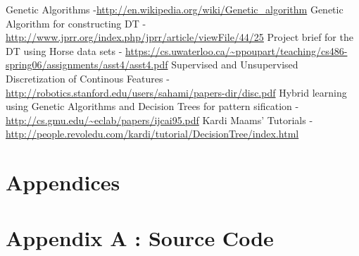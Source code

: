 \documentclass[12pt]{report}
\begin{document}
\newpage

\begin{thebibliography}{refs}
Genetic Algorithms  -\url{http://en.wikipedia.org/wiki/Genetic_algorithm}
Genetic Algorithm for constructing DT - \url{http://www.jprr.org/index.php/jprr/article/viewFile/44/25}
 Project brief for the DT  using Horse data sets  - \url{https://cs.uwaterloo.ca/~ppoupart/teaching/cs486-spring06/assignments/asst4/asst4.pdf}
Supervised and Unsupervised Discretization of Continous Features - \url{http://robotics.stanford.edu/users/sahami/papers-dir/disc.pdf}
Hybrid learning using Genetic Algorithms and Decision Trees for pattern sification - \url{http://cs.gmu.edu/~eclab/papers/ijcai95.pdf}
Kardi Maams' Tutorials - \url{http://people.revoledu.com/kardi/tutorial/DecisionTree/index.html}

\end{thebibliography}

\newpage
\pagestyle{fancy}
\chead{}
\rfoot{\small{\thepage}}
\renewcommand{\headrulewidth}{0.4pt}
\renewcommand{\footrulewidth}{0.4pt}

\section*{Appendices}
\section*{Appendix A : Source Code}
%
%
%
%
%
%
%
%
%
%
%
\end{document}
